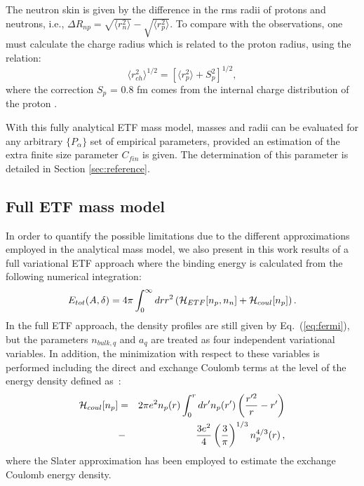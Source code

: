 \documentclass
[aps,prc,twocolumn,showpacs,showkeys,amsmath,floatfix,superscriptaddress]{revtex4}
\begin{document}
{The neutron skin is given by the difference in the rms radii of protons and neutrons, i.e.,
$\Delta R_{np} = \sqrt{ \langle r_n^2 \rangle} - \sqrt{ \langle r_p^2 \rangle}$. 
To compare with the observations, one must calculate the charge radius which is related to
the proton radius, using the relation:
$$ \langle r^2_{ch} \rangle^{1/2} = \left[ \langle r^2_p \rangle + S_p^2 \right]^{1/2},$$
where the correction $S_p$ = 0.8 fm comes from the internal charge distribution of the proton \cite{Buchinger,Patyk}. 

With this fully analytical ETF mass model, 
masses and radii can be evaluated for any arbitrary $\{ P_\alpha\}$ set of empirical parameters, 
provided an estimation of the extra finite size parameter $C_{fin}$ is given. The determination of this parameter is detailed in Section \ref{sec:reference}.
 
 



\subsection{Full ETF  {mass model}}
\label{sec:full_ETF}

In order to quantify the possible limitations due to the different approximations employed in the analytical mass model, we also present in this work
results of a full variational ETF approach where the binding energy is calculated from the following numerical integration:
%
\begin{equation}
E_{tot}(A,\delta)=4\pi \int_0^\infty dr r^2 \left ({\cal{H}}_{ETF} [n_p, n_n]+{\cal{H}}_{coul} [n_p]\right ).
\end{equation}
%
In the full ETF approach, the density profiles are still given by Eq.~(\ref{eq:fermi}), but the parameters $n_{bulk, q}$ and $a_q$ are treated as four 
independent variational variables.
In addition, the minimization with respect to these variables is performed including the direct and exchange Coulomb terms at the level of the energy density 
defined as~\cite{onsi08}:
%
\begin{eqnarray}
 {\cal{H}}_{coul} [n_p]&=&2\pi e^2 n_p(r)   \int_0^r dr' n_p(r')\left (\frac{r'^2}{r}-r'\right ) \nonumber \\
&-&\frac{3e^2}{4} \left (\frac{3}{\pi}\right)^{1/3}n_p^{4/3}(r) \,,
\end{eqnarray}
%
where the Slater approximation has been employed to estimate the exchange Coulomb energy density.





}
\end{document}
